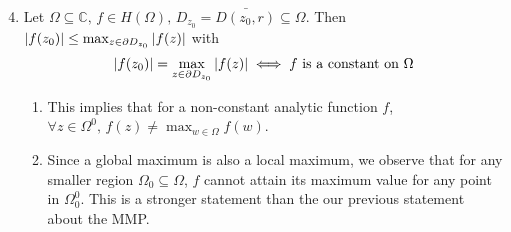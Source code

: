\documentclass[notoc,notitlepage]{tufte-book}
\begin{document}
\begin{enumerate}
	\setcounter{enumi}{3}
	\item {} Let $\Omega \subseteq \mathbb{C}, \, f \in H(\Omega), \, D_{z_0} = \bar{D(z_0, r)} \subseteq \Omega$. Then $\left|f(z_0)\right| \leq \max_{z \in \partial D_{z_0}} \left|f(z)\right|$ with \label{item:maximum_modulus_principle_strong}
	\begin{equation*}
		\left|f(z_0)\right| = \max_{z \in \partial D_{z_0}} \left|f(z)\right| \iff f \text{ is a constant on } \Omega
	\end{equation*}

	\begin{remark}
		\begin{enumerate}
			\item This implies that for a non-constant analytic function $f$, $\forall z \in \Omega^0, \, f(z) \neq \max_{w \in \Omega} f(w)$.
			\item Since a global maximum is also a local maximum, we observe that for any smaller region $\Omega_0 \subseteq \Omega$, $f$ cannot attain its maximum value for any point in $\Omega_0^0$. This is a stronger statement than the our previous statement about the MMP.
		\end{enumerate}
	\end{remark}


\end{enumerate}
\end{document}
